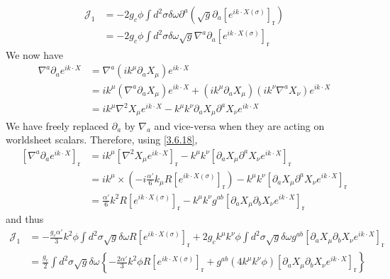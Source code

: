 \begin{tcolorbox}[breakable]
		\begin{align}
			\mathcal{J}_1 &= -2 g_c \phi \int d^2 \sigma \delta \omega \partial^a\left(\sqrt{g} \partial_a\left[e^{i k \cdot X(\sigma)}\right]_{\mathrm{r}}\right) \nonumber \\
			&= -2 g_c \phi \int d^2 \sigma \delta \omega \sqrt{g} \nabla^a \partial_a\left[e^{i k \cdot X(\sigma)}\right]_{\mathrm{r}}
		\end{align}
		We now have
		\begin{align}
			\nabla^a \partial_a e^{i k \cdot X} &= \nabla^a\left(i k^\mu \partial_a X_\mu\right) e^{i k \cdot X} \nonumber \\
			&= i k^\mu\left(\nabla^a \partial_a X_\mu\right) e^{i k \cdot X} + \left(i k^\mu \partial_a X_\mu\right)\left(i k^\nu \nabla^a X_\nu\right) e^{i k \cdot X} \nonumber \\
			&= i k^\mu \nabla^2 X_\mu e^{i k \cdot X} - k^\mu k^\nu \partial_a X_\mu \partial^a X_\nu e^{i k \cdot X}
		\end{align}
		We have freely replaced $\partial_a$ by $\nabla_a$ and vice-versa when they are acting on worldsheet scalars. Therefore, using \eqref{3.6.18},
		\begin{align}
			\left[\nabla^a \partial_a e^{i k \cdot X}\right]_{\mathrm{r}} &= i k^\mu\left[\nabla^2 X_\mu e^{i k \cdot X}\right]_{\mathrm{r}} - k^\mu k^\nu\left[\partial_a X_\mu \partial^a X_\nu e^{i k \cdot X}\right]_{\mathrm{r}} \nonumber \\
			&= i k^\mu \times\left(-i \frac{\alpha'}{6} k_\mu R\left[e^{i k \cdot X(\sigma)}\right]_{\mathrm{r}}\right) - k^\mu k^\nu\left[\partial_a X_\mu \partial^a X_\nu e^{i k \cdot X}\right]_{\mathrm{r}} \nonumber \\
			&= \frac{\alpha'}{6} k^2 R\left[e^{i k \cdot X(\sigma)}\right]_{\mathrm{r}} - k^\mu k^\nu g^{a b}\left[\partial_a X_\mu \partial_b X_\nu e^{i k \cdot X}\right]_{\mathrm{r}}
		\end{align}
		and thus
		\begin{align}
			\mathcal{J}_1 &= -\frac{g_c \alpha'}{3} k^2 \phi \int d^2 \sigma \sqrt{g} \delta \omega R\left[e^{i k \cdot X(\sigma)}\right]_{\mathrm{r}} + 2 g_c k^\mu k^\nu \phi \int d^2 \sigma \sqrt{g} \delta \omega g^{a b}\left[\partial_a X_\mu \partial_b X_\nu e^{i k \cdot X}\right]_{\mathrm{r}} \nonumber \\
			&= \frac{g_c}{2} \int d^2 \sigma \sqrt{g} \delta \omega\left\{-\frac{2 \alpha'}{3} k^2 \phi R\left[e^{i k \cdot X(\sigma)}\right]_{\mathrm{r}} + g^{a b}\left(4 k^\mu k^\nu \phi\right)\left[\partial_a X_\mu \partial_b X_\nu e^{i k \cdot X}\right]_{\mathrm{r}}\right\}\label{3.179}

\end{align}
\end{tcolorbox}
